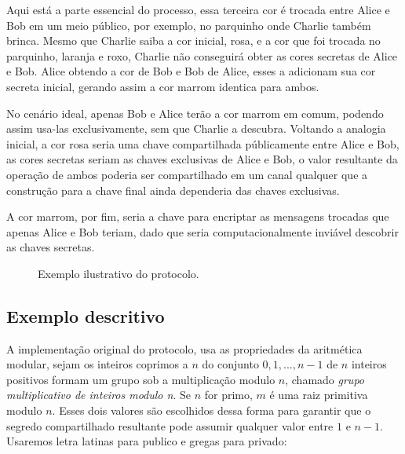 \documentclass{article}
\begin{document}
Aqui está a parte essencial do processo, essa terceira cor é trocada entre
Alice e Bob em um meio público, por exemplo, no parquinho onde Charlie também
brinca. Mesmo que Charlie saiba a cor inicial, rosa, e a cor que foi trocada no
parquinho, laranja e roxo, Charlie não conseguirá obter as cores secretas de
Alice e Bob. Alice obtendo a cor de Bob e Bob de Alice, esses a adicionam sua
cor secreta inicial, gerando assim a cor marrom identica para ambos.

No cenário ideal, apenas Bob e Alice terão a cor marrom em comum, podendo assim
usa-las exclusivamente, sem que Charlie a descubra. Voltando a analogia inicial,
a cor rosa seria uma chave compartilhada públicamente entre Alice e Bob, as
cores secretas seriam as chaves exclusivas de Alice e Bob, o valor resultante
da operação de ambos poderia ser compartilhado em um canal qualquer que a
construção para a chave final ainda dependeria das chaves exclusivas.

A cor marrom, por fim, seria a chave para encriptar as mensagens trocadas que
apenas Alice e Bob teriam, dado que seria computacionalmente inviável descobrir
as chaves secretas.


\begin{figure}[htpb]
    \centering
    
    \caption{Exemplo ilustrativo do protocolo.}%
    \label{fig:diagram}
\end{figure}

\subsection{Exemplo descritivo}%
\label{sub:exemplo_descritivo}
A implementação original do protocolo\cite{Diffie}, usa as propriedades da
aritmética modular, sejam os inteiros coprimos a $n$ do conjunto
${0, 1, ..., n-1}$ de $n$ inteiros positivos formam um grupo sob a
multiplicação modulo $n$, chamado \textit{grupo multiplicativo de inteiros
modulo n}. Se $n$ for primo, $m$ é uma raiz primitiva modulo $n$. Esses dois
valores são escolhidos dessa forma para garantir que o segredo compartilhado
resultante pode assumir qualquer valor entre $1$ e $n-1$. Usaremos letra
latinas para publico e gregas para privado:
\end{document}
